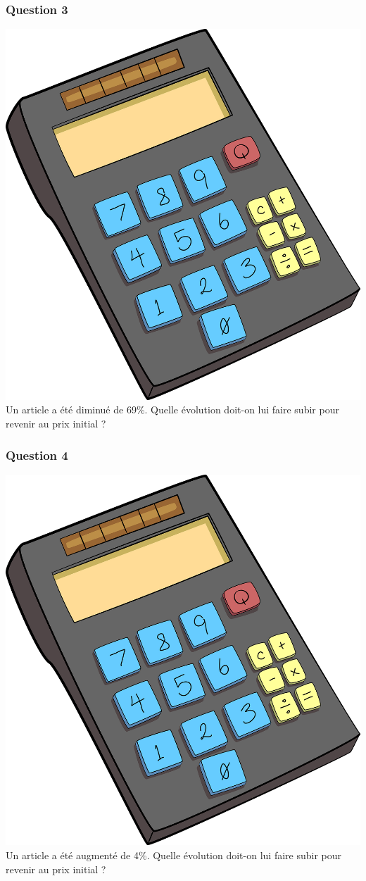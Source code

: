 \documentclass[15pt, mathserif]{beamer}
\begin{document}
\begin{frame} 
	\frametitle{Question 3}
 \includegraphics[scale=0.01]{calculatrice} Un article a été diminué de 69\%. Quelle évolution doit-on lui faire subir pour revenir au prix initial ? \end{frame}


\begin{frame} 
	\frametitle{Question 4}
 \includegraphics[scale=0.01]{calculatrice} Un article a été augmenté de 4\%. Quelle évolution doit-on lui faire subir pour revenir au prix initial ? \end{frame}
\end{document}
